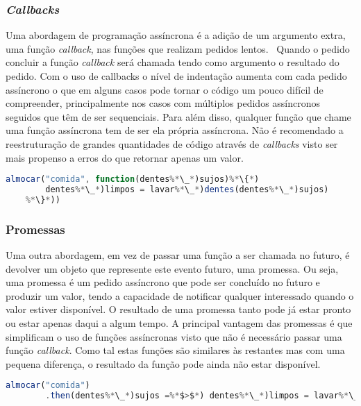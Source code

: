 \subsubsection{\textit{Callbacks}}
Uma abordagem de programação assíncrona é a adição de um argumento extra, uma função \textit{callback}, nas funções que realizam pedidos lentos.~\cite{elojs} Quando o pedido concluir a função \textit{callback} será chamada tendo como argumento o resultado do pedido. Com o uso de callbacks o nível de indentação aumenta com cada pedido assíncrono o que em alguns casos pode tornar o código um pouco difícil de compreender, principalmente nos casos com múltiplos pedidos assíncronos seguidos que têm de ser sequenciais. Para além disso, qualquer função que chame uma função assíncrona tem de ser ela própria assíncrona. Não é recomendado a reestruturação de grandes quantidades de código através de \textit{callbacks} visto ser mais propenso a erros do que retornar apenas um valor.

\begin{lstlisting}[language=JavaScript, caption=Exemplo de uma \textit{Callback}]
    almocar("comida", function(dentes%*\_*)sujos)%*\{*)
        dentes%*\_*)limpos = lavar%*\_*)dentes(dentes%*\_*)sujos)
    %*\}*))
\end{lstlisting}

\subsubsection{Promessas}
Uma outra abordagem, em vez de passar uma função a ser chamada no futuro, é devolver um objeto que represente este evento futuro, uma promessa. Ou seja, uma promessa é um pedido assíncrono que pode ser concluído no futuro e produzir um valor, tendo a capacidade de notificar qualquer interessado quando o valor estiver disponível.\cite{elojs} O resultado de uma promessa tanto pode já estar pronto ou estar apenas daqui a algum tempo. A principal vantagem das promessas é que simplificam o uso de funções assíncronas visto que não é necessário passar uma função \textit{callback}. Como tal estas funções são similares às restantes mas com uma pequena diferença, o resultado da função pode ainda não estar disponível. 

\begin{lstlisting}[language=JavaScript, caption=Exemplo de uma Promessa]
    almocar("comida")
        .then(dentes%*\_*)sujos =%*$>$*) dentes%*\_*)limpos = lavar%*\_*)dentes(dentes%*\_*)sujos))
\end{lstlisting}

